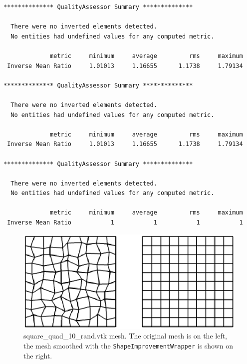 \begin{verbatim}
************** QualityAssessor Summary **************

  There were no inverted elements detected. 
  No entities had undefined values for any computed metric.

             metric     minimum     average         rms     maximum
 Inverse Mean Ratio     1.01013     1.16655      1.1738     1.79134

************** QualityAssessor Summary **************

  There were no inverted elements detected. 
  No entities had undefined values for any computed metric.

             metric     minimum     average         rms     maximum
 Inverse Mean Ratio     1.01013     1.16655      1.1738     1.79134

************** QualityAssessor Summary **************

  There were no inverted elements detected. 
  No entities had undefined values for any computed metric.

             metric     minimum     average         rms     maximum
 Inverse Mean Ratio           1           1           1           1
\end{verbatim}
\begin{figure}[htbp]
\begin{center}
    \includegraphics{square_rand.eps}
    \caption{square\_quad\_10\_rand.vtk mesh. The original mesh is on the left, the mesh smoothed with the \texttt{ShapeImprovementWrapper} is shown on the right.}
    \label{fig:square_rand}
\end{center}
\end{figure}



